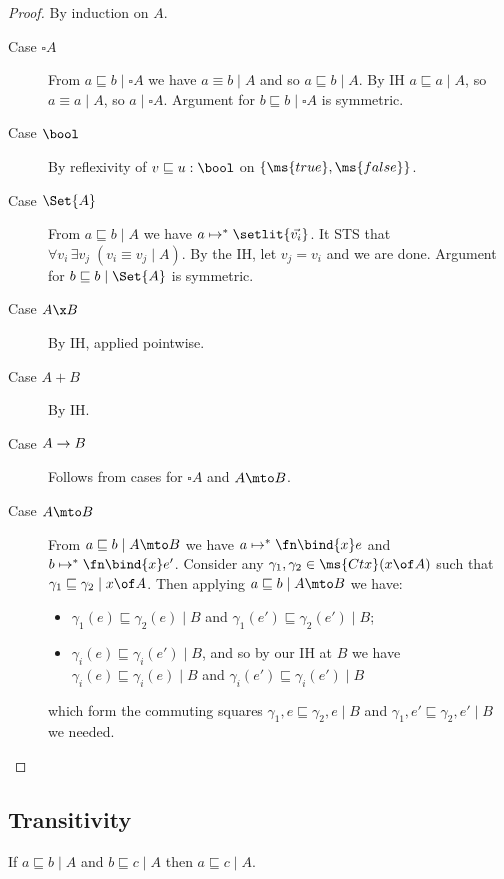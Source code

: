 \documentclass{article}
\newcommand{\ale}{\sqsubseteq}
\newcommand{\aeq}{\equiv}
\newcommand{\step}{\mapsto}
\newcommand{\steps}{\step^*}
\newcommand{\disc}[1]{\square{#1}}
\newcommand{\lr}[2]{#2\mathrel{|}#1}
\newcommand{\commsq}[5]{\lr{#1}{{#2}, {#4} \ale {#3}, {#5}}}
\begin{document}
\begin{proof}
  By induction on $A$.
  \begin{description}
  \item[Case $\disc{A}$] From $\lr{\disc{A}}{a \ale b}$ we have $\lr{A}{a \aeq
    b}$ and so $\lr{A}{a \ale b}$. By IH $\lr{A}{a \ale a}$, so $\lr{A}{a \aeq
    a}$, so $\lr{\disc{A}}{a}$. Argument for $\lr{\disc{A}}{b \ale b}$ is
    symmetric.

  \item[Case $\bool$] By reflexivity of $v \ale u : \bool$ on
    $\{\ms{true},\ms{false}\}$.

  \item[Case $\Set{A}$] From $\lr{A}{a \ale b}$ we have $a \steps
    \setlit{\vec{v_i}}$. It STS that $\forall v_i\, \exists v_j\; (\lr{A}{v_i
      \aeq v_j})$. By the IH, let $v_j = v_i$ and we are done. Argument for
    $\lr{\Set{A}}{b \ale b}$ is symmetric.

  \item[Case $A \x B$] By IH, applied pointwise. 
  \item[Case $A + B$] By IH. 
  \item[Case $A \to B$] Follows from cases for $\disc{A}$ and $A \mto B$.

  \item[Case $A \mto B$] From $\lr{A \mto B}{a \ale b}$ we have $a \steps
    \fn\bind{x} e$ and $b \steps \fn\bind{x} e'$. Consider any $\gamma_1,
    \gamma_2 \in \ms{Ctx}(x \of A)$ such that $\lr{x\of A}{\gamma_1 \ale
      \gamma_2}$. Then applying $\lr{A \mto B}{a \ale b}$ we have:
    \begin{itemize}
    \item $\lr{B}{\gamma_1(e) \ale \gamma_2(e)}$ and $\lr{B}{\gamma_1(e') \ale
      \gamma_2(e')}$;
    \item $\lr{B}{\gamma_i(e) \ale \gamma_i(e')}$, and so by our IH at $B$ we
      have $\lr{B}{\gamma_i(e) \ale \gamma_i(e)}$ and $\lr{B}{\gamma_i(e') \ale
        \gamma_i(e')}$
    \end{itemize}
    which form the commuting squares $\commsq{B}{\gamma_1}{\gamma_2}{e}{e}$ and
    $\commsq{B}{\gamma_1}{\gamma_2}{e'}{e'}$ we needed.
  \end{description}
\end{proof}


\subsection{Transitivity}
\begin{theorem}[Transitivity]\label{thm:trans}
  If $\lr{A}{a \ale b}$ and $\lr{A}{b \ale c}$ then $\lr{A}{a \ale c}$.
\end{theorem}
\end{document}
